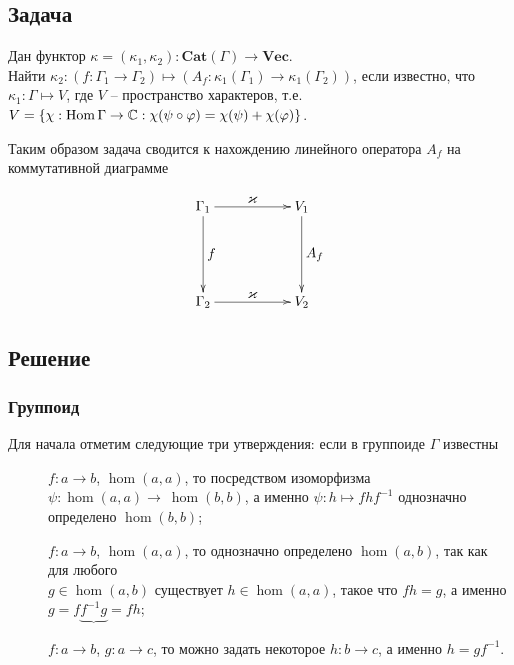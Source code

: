 \subsection*{Задача}
    Дан функтор $\kappa = (\kappa_1, \kappa_2): \mathbf{Cat}(\Gamma) \to 
    \mathbf{Vec}$.\\
    Найти $\kappa_2 : (f: \Gamma_1 \to \Gamma_2) \mapsto 
    (A_f: \kappa_1(\Gamma_1) \to \kappa_1(\Gamma_2))$, если известно, что 
    $\kappa_1 : \Gamma \mapsto V$, где $V$ -- пространство характеров, т.е. 
    $V = \{\chi: \operatorname*{Hom} \Gamma \to \mathbb{C}: \chi(\psi \circ \varphi) = 
    \chi(\psi) + \chi(\varphi)\}$.

    Таким образом задача сводится к нахождению линейного оператора $A_f$ на 
    коммутативной диаграмме

    \begin{equation}\label{cd_problem}
    \xymatrix{
        \Gamma_1 \ar[dd]^{\textstyle{f}} \ar[rr]^{\textstyle{\kappa}} & & V_1 \ar[dd]^{\textstyle{A_f}} \\
                                            & & \\
        \Gamma_2 \ar[rr]^{\textstyle{\kappa}}           & & V_2
    }
    \end{equation}

\subsection*{Решение}

\subsubsection{Группоид}
    Для начала отметим следующие три утверждения: если в группоиде $\Gamma$ 
    известны
    \begin{description}
        \item[] $f: a \to b$, $\hom(a,a)$, то посредством 
        изоморфизма $\psi : \hom(a,a) \to~\hom(b,b)$, а именно $\psi: h \mapsto 
        fhf^{-1}$ однозначно определено $\hom(b,b)$;
        \item[] $f: a \to b$, $\hom(a,a)$, то однозначно 
        определено $\hom(a,b)$, так как для любого \\$g \in \hom(a,b)$ существует 
        $h \in \hom(a,a)$, такое что $fh = g$, а именно \\$g = 
        f\underbrace{f^{-1}g} = fh$;
        \item[] $f: a \to b$, $g: a \to c$, то можно задать 
        некоторое $h: b \to c$, а именно $h = gf^{-1}$.
    \end{description}

